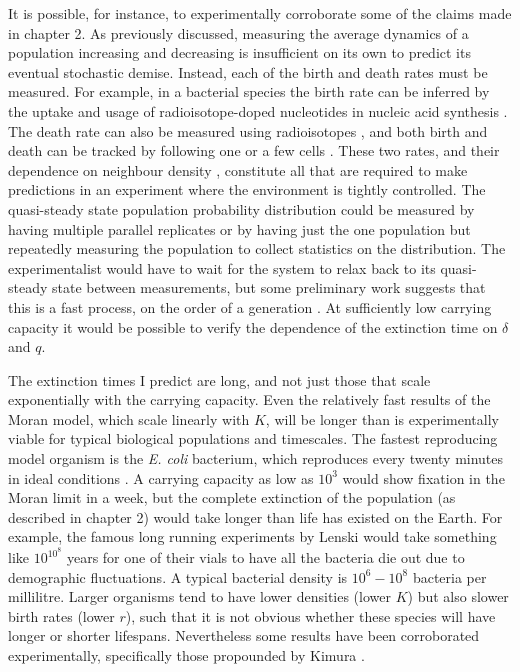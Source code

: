 It is possible, for instance, to experimentally corroborate some of the claims made in chapter 2. %
As previously discussed, measuring the average dynamics of a population increasing and decreasing is insufficient on its own to predict its eventual stochastic demise. 
Instead, each of the birth and death rates must be measured. 
For example, in a bacterial species the birth rate can be inferred by the uptake and usage of radioisotope-doped nucleotides in nucleic acid synthesis \cite{Kirchman1982}. 
The death rate can also be measured using radioisotopes \cite{Servais1985}, and both birth and death can be tracked by following one or a few cells \cite{Wheeler2003,Groisman2005,Wang2010,Lee2012,Grunberger2014}. %
These two rates, and their dependence on neighbour density \cite{Nadell2008,Vulic2001,Greenhalgh1990,VanMelderen2009,Rankin2012}, constitute all that are required to make predictions in an experiment where the environment is tightly controlled. 
The quasi-steady state population probability distribution could be measured by having multiple parallel replicates or by having just the one population but repeatedly measuring the population to collect statistics on the distribution. 
The experimentalist would have to wait for the system to relax back to its quasi-steady state between measurements, but some preliminary work suggests that this is a fast process, on the order of a generation \cite{Badali2019b}. 
At sufficiently low carrying capacity it would be possible to verify the dependence of the extinction time on $\delta$ and $q$. 

The extinction times I predict are long, and not just those that scale exponentially with the carrying capacity. %
Even the relatively fast results of the Moran model, which scale linearly with $K$, will be longer than is experimentally viable for typical biological populations and timescales. 
The fastest reproducing model organism is the \emph{E. coli} bacterium, which reproduces every twenty minutes in ideal conditions \cite{Lenski1991,Brock2006}. 
A carrying capacity as low as $10^3$ would show fixation in the Moran limit in a week, but the complete extinction of the population (as described in chapter 2) would take longer than life has existed on the Earth. 
For example, the famous long running experiments by Lenski \cite{Lenski1991} would take something like $10^{10^8}$ years for one of their vials to have all the bacteria die out due to demographic fluctuations. 
A typical bacterial density is $10^6 - 10^8$ bacteria per millilitre. 
Larger organisms tend to have lower densities (lower $K$) but also slower birth rates (lower $r$), such that it is not obvious whether these species will have longer or shorter lifespans. 
Nevertheless some results have been corroborated experimentally, specifically those propounded by Kimura \cite{Kimura1980,Kimura1983}. 

